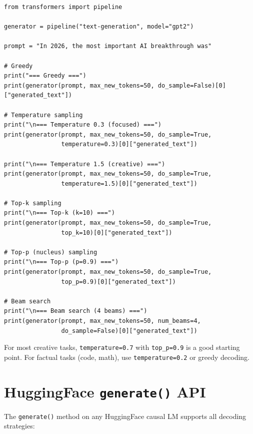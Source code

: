 \begin{verbatim}
from transformers import pipeline

generator = pipeline("text-generation", model="gpt2")

prompt = "In 2026, the most important AI breakthrough was"

# Greedy
print("=== Greedy ===")
print(generator(prompt, max_new_tokens=50, do_sample=False)[0]["generated_text"])

# Temperature sampling
print("\n=== Temperature 0.3 (focused) ===")
print(generator(prompt, max_new_tokens=50, do_sample=True,
                temperature=0.3)[0]["generated_text"])

print("\n=== Temperature 1.5 (creative) ===")
print(generator(prompt, max_new_tokens=50, do_sample=True,
                temperature=1.5)[0]["generated_text"])

# Top-k sampling
print("\n=== Top-k (k=10) ===")
print(generator(prompt, max_new_tokens=50, do_sample=True,
                top_k=10)[0]["generated_text"])

# Top-p (nucleus) sampling
print("\n=== Top-p (p=0.9) ===")
print(generator(prompt, max_new_tokens=50, do_sample=True,
                top_p=0.9)[0]["generated_text"])

# Beam search
print("\n=== Beam search (4 beams) ===")
print(generator(prompt, max_new_tokens=50, num_beams=4,
                do_sample=False)[0]["generated_text"])
\end{verbatim}

\begin{aitip}
For most creative tasks, \texttt{temperature=0.7} with \texttt{top\_p=0.9} is a good starting point. For factual tasks (code, math), use \texttt{temperature=0.2} or greedy decoding.
\end{aitip}

\section{HuggingFace \texttt{generate()} API}

The \texttt{generate()} method on any HuggingFace causal LM supports all decoding strategies:

